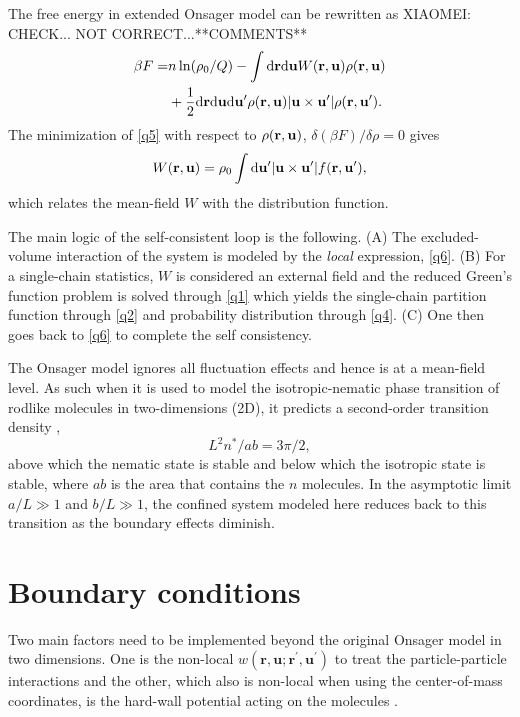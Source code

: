 \documentclass[pre,twocolumn,preprintnumbers,reprint]{revtex4}
\newcommand{\bu}{{\bf u}}
\newcommand{\br}{{\bf r}}
\newcommand{\rd}{{\rm d}}
\newcommand{\be}{\begin{equation}}
\newcommand{\en}{\end{equation}}
\begin{document}
The free energy in extended Onsager model can be rewritten as {XIAOMEI: CHECK... NOT CORRECT...}**COMMENTS**
\begin{align}\label{q5}
\beta F=&n\ln(\rho_0/Q)-\int\rd\br\rd\bu W(\br,\bu)\rho(\br,\bu)\nonumber\\
 &+\frac{1}{2}\rd\br\rd\bu\rd\bu'\rho(\br,\bu)|\bu\times\bu'|\rho(\br,\bu').
\end{align}
The minimization of \eqref{q5} with respect to $\rho(\br,\bu)$, $\delta (\beta F)/\delta\rho=0$ gives
\be \label{q6}
W(\br,\bu)=\rho_0\int\rd\bu'|\bu\times\bu'|f(\br,\bu'),
\en
which relates the mean-field $W$ with the distribution function.

The main logic of the self-consistent loop is the following. (A) The excluded-volume interaction of the system is modeled by the {\emph{local}} expression, \eqref{q6}. (B) For a single-chain statistics, $W$ is considered an external field and the reduced Green's function problem is solved through \eqref{q1} which yields the single-chain partition function through \eqref{q2} and probability distribution through \eqref{q4}. (C) One then goes back to \eqref{q6} to complete the self consistency.

The Onsager model ignores all fluctuation effects and hence is at a mean-field level. As such when it is used to model the isotropic-nematic phase transition of rodlike molecules in two-dimensions (2D), it predicts a second-order transition density \cite{Kayser1978,Cuesta1989,Chen1993},
\begin{equation}\label{ncriticql}
L^2 n^*/ab  = 3\pi/2,
\end{equation}
above which the nematic state is stable and below which the isotropic state is stable, where $ab$ is the area that contains the $n$ molecules. In the asymptotic limit $a/L \gg 1$ and $b/L \gg 1$, the confined system modeled here reduces back to this transition as the boundary effects diminish.

\section*{Boundary conditions}

Two main factors need to be implemented beyond the original Onsager model in two dimensions. One is the non-local $w(\mathbf{r},\mathbf{u};\mathbf{r}^\prime, \mathbf{u}^\prime)$ to treat the particle-particle interactions and the other, which also is non-local when using the center-of-mass coordinates, is the hard-wall potential acting on the molecules \cite{Holyst88,Chen1995,Koch1999,Roij01}.
\end{document}
